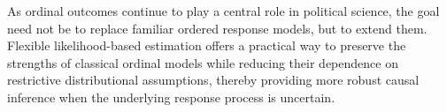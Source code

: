 \documentclass{article}
\begin{document}
As ordinal outcomes continue to play a central role in political science, the goal need not be to replace familiar ordered response models, but to extend them. Flexible likelihood-based estimation offers a practical way to preserve the strengths of classical ordinal models while reducing their dependence on restrictive distributional assumptions, thereby providing more robust causal inference when the underlying response process is uncertain.




\end{document}
